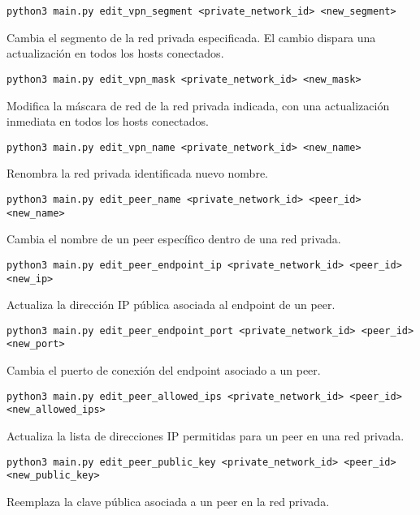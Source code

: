     \begin{Verbatim}[breaklines=true]
    python3 main.py edit_vpn_segment <private_network_id> <new_segment>
    \end{Verbatim}
    Cambia el segmento de la red privada especificada. El cambio dispara una actualización en todos los hosts conectados.
    
    \begin{Verbatim}[breaklines=true]
    python3 main.py edit_vpn_mask <private_network_id> <new_mask>
    \end{Verbatim} 
    Modifica la máscara de red de la red privada indicada, con una actualización inmediata en todos los hosts conectados.
    
    \begin{Verbatim}[breaklines=true]
        python3 main.py edit_vpn_name <private_network_id> <new_name>
    \end{Verbatim}
    Renombra la red privada identificada nuevo nombre.
    
    \begin{Verbatim}[breaklines=true]
        python3 main.py edit_peer_name <private_network_id> <peer_id> <new_name>
    \end{Verbatim}
    Cambia el nombre de un peer específico dentro de una red privada.
    
    \begin{Verbatim}[breaklines=true]
    python3 main.py edit_peer_endpoint_ip <private_network_id> <peer_id> <new_ip>
    \end{Verbatim}
    Actualiza la dirección IP pública asociada al endpoint de un peer.
    
    \begin{Verbatim}[breaklines=true]
        python3 main.py edit_peer_endpoint_port <private_network_id> <peer_id> <new_port>
    \end{Verbatim}
    Cambia el puerto de conexión del endpoint asociado a un peer.
    
    \begin{Verbatim}[breaklines=true]
        python3 main.py edit_peer_allowed_ips <private_network_id> <peer_id> <new_allowed_ips>
    \end{Verbatim}
    Actualiza la lista de direcciones IP permitidas para un peer en una red privada.
    
    \begin{Verbatim}[breaklines=true]
        python3 main.py edit_peer_public_key <private_network_id> <peer_id> <new_public_key>
    \end{Verbatim}
    Reemplaza la clave pública asociada a un peer en la red privada.
    